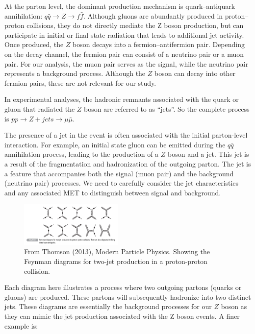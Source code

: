 At the parton level, the dominant production mechanism is quark–antiquark annihilation: $q \bar{q} \to Z \to f \bar{f}$. Although gluons are abundantly produced in proton–proton collisions, they do not directly mediate the Z boson production, but can participate in initial or final state radiation that leads to additional jet activity. Once produced, the $Z$ boson decays into a fermion–antifermion pair. Depending on the decay channel, the fermion pair can consist of a neutrino pair or a muon pair. For our analysis, the muon pair serves as the signal, while the neutrino pair represents a background process. Although the $Z$ boson can decay into other fermion pairs, these are not relevant for our study.

In experimental analyses, the hadronic remnants associated with the quark or gluon that radiated the $Z$ boson are referred to as ``jets''. So the complete process is $pp \to Z + jets \to \mu \bar{\mu}$.

The presence of a jet in the event is often associated with the initial parton-level interaction.  For example, an initial state gluon can be emitted during the $q \bar{q} $ annihilation process, leading to the production of a $Z$ boson and a jet. This jet is a result of the fragmentation and hadronization of the outgoing parton.  The jet is a feature that accompanies both the signal (muon pair) and the background (neutrino pair) processes. We need to carefully consider the jet characteristics and any associated MET to distinguish between signal and background.

\begin{figure}[H]
    \centering
    \includegraphics[width=0.45\textwidth]{AnalyzingColliderEvents/figures/Parton_pp.png}
    \caption{ From Thomson (2013), Modern Particle Physics. \cite{thomson} Showing the Feynman diagrams for two-jet production in a proton-proton collision.}
\end{figure}

Each diagram here illustrates a process where two outgoing partons (quarks or gluons) are produced. These partons will subsequently hadronize into two distinct jets. These diagrams are essentially the background processes for our $Z$ boson as they can mimic the jet production associated with the Z boson events. A finer example is: 

